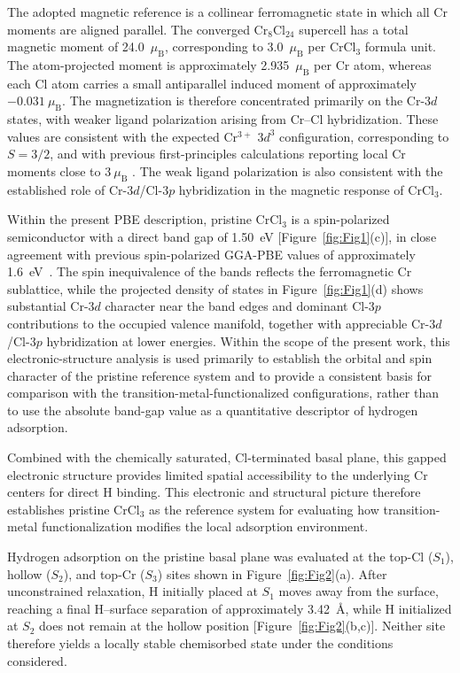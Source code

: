 \documentclass[journal=jacsat,manuscript=article]{achemso}
\begin{document}
The adopted magnetic reference is a collinear ferromagnetic state in which all Cr moments are aligned parallel. The converged Cr$_8$Cl$_{24}$ supercell has a total magnetic moment of 24.0~$\mu_{\mathrm B}$, corresponding to 3.0~$\mu_{\mathrm B}$ per CrCl$_3$ formula unit. The atom-projected moment is approximately 2.935~$\mu_{\mathrm B}$ per Cr atom, whereas each Cl atom carries a small antiparallel induced moment of approximately $-0.031~\mu_{\mathrm B}$. The magnetization is therefore concentrated primarily on the Cr-$3d$ states, with weaker ligand polarization arising from Cr--Cl hybridization. These values are consistent with the expected Cr$^{3+}$ $3d^3$ configuration, corresponding to $S=3/2$, and with previous first-principles calculations reporting local Cr moments close to $3~\mu_{\mathrm B}$ \cite{Gao2018,Mastrippolito2022,Soriano2020}. The weak ligand polarization is also consistent with the established role of Cr-$3d$/Cl-$3p$ hybridization in the magnetic response of CrCl$_3$\cite{Besbes2019}.

Within the present PBE description, pristine CrCl$_3$ is a spin-polarized semiconductor with a direct band gap of 1.50~eV [Figure~\ref{fig:Fig1}(c)], in close agreement with previous spin-polarized GGA-PBE values of approximately 1.6~eV~\cite{Gao2018,Luo2020}. The spin inequivalence of the bands reflects the ferromagnetic Cr sublattice, while the projected density of states in Figure~\ref{fig:Fig1}(d) shows substantial Cr-$3d$ character near the band edges and dominant Cl-$3p$ contributions to the occupied valence manifold, together with appreciable Cr-$3d$/Cl-$3p$ hybridization at lower energies. Within the scope of the present work, this electronic-structure analysis is used primarily to establish the orbital and spin character of the pristine reference system and to provide a consistent basis for comparison with the transition-metal-functionalized configurations, rather than to use the absolute band-gap value as a quantitative descriptor of hydrogen adsorption.

Combined with the chemically saturated, Cl-terminated basal plane, this gapped electronic structure provides limited spatial accessibility to the underlying Cr centers for direct H binding. This electronic and structural picture therefore establishes pristine CrCl$_3$ as the reference system for evaluating how transition-metal functionalization modifies the local adsorption environment.

Hydrogen adsorption on the pristine basal plane was evaluated at the top-Cl ($S_1$), hollow ($S_2$), and top-Cr ($S_3$) sites shown in Figure~\ref{fig:Fig2}(a). After unconstrained relaxation, H initially placed at $S_1$ moves away from the surface, reaching a final H--surface separation of approximately 3.42~\AA, while H initialized at $S_2$ does not remain at the hollow position [Figure~\ref{fig:Fig2}(b,c)]. Neither site therefore yields a locally stable chemisorbed state under the conditions considered.
\end{document}
